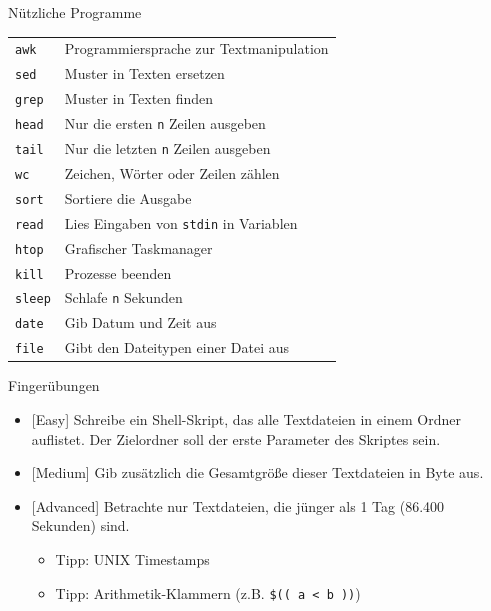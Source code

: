 \documentclass[compress]{beamer}
\begin{document}
\begin{frame}[fragile]{Nützliche Programme}
\begin{tabularx}{\textwidth}{lX}
\verb+awk+ & Programmiersprache zur Textmanipulation
\\
\verb+sed+ & Muster in Texten ersetzen
\\
\verb+grep+ & Muster in Texten finden
\\
\verb+head+ & Nur die ersten \verb+n+ Zeilen ausgeben
\\
\verb+tail+ & Nur die letzten \verb+n+ Zeilen ausgeben
\\
\verb+wc+ & Zeichen, Wörter oder Zeilen zählen
\\
\verb+sort+ & Sortiere die Ausgabe
\\
\verb+read+ &Lies Eingaben von \verb+stdin+ in Variablen
\\
\verb+htop+ & Grafischer Taskmanager
\\
\verb+kill+ &  Prozesse beenden
\\
\verb+sleep+ & Schlafe \verb+n+ Sekunden
\\
\verb+date+ & Gib Datum und Zeit aus
\\
\verb+file+ & Gibt den Dateitypen einer Datei aus
\end{tabularx}
\end{frame}

\begin{frame}[fragile]{Fingerübungen}
\begin{itemize}
\item {} {\color{darkred}[Easy]} Schreibe ein Shell-Skript, das alle Textdateien in einem Ordner auflistet. Der Zielordner soll der erste Parameter des Skriptes sein.
\item {} {\color{darkred}[Medium]} Gib zusätzlich die Gesamtgröße dieser Textdateien in Byte aus.
\item {} {\color{darkred}[Advanced]} Betrachte nur Textdateien, die jünger als 1 Tag (86.400 Sekunden) sind.
\begin{itemize}
\item Tipp: UNIX Timestamps
\item Tipp: Arithmetik-Klammern (z.B. \verb+$(( a < b ))+)
\end{itemize}
\end{itemize}
\end{frame}
\end{document}
